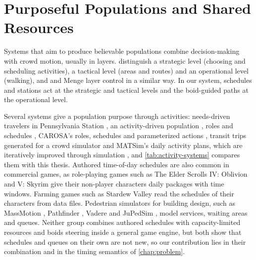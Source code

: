 \section{Purposeful Populations and Shared Resources}\label{sec:soa-purpose}

Systems that aim to produce believable populations combine decision-making with crowd motion, usually in layers. \citet{hoogendoorn2004pedestrian} distinguish a strategic level (choosing and scheduling activities), a tactical level (areas and routes) and an operational level (walking), and \citet{musse2001hierarchical} and Menge \citep{curtis2016menge} layer control in a similar way. In our system, schedules and stations act at the strategic and tactical levels and the boid-guided paths at the operational level.

Several systems give a population purpose through activities: needs-driven travelers in Pennsylvania Station \citep{shao2007autonomous}, an activity-driven population \citep{paris2009activity}, roles and schedules \citep{pelechano2008virtual}, CAROSA's roles, schedules and parameterized actions \citep{allbeck2010carosa}, transit trips generated for a crowd simulator \citep{ricks2020generation} and MATSim's daily activity plans, which are iteratively improved through simulation \citep{horni2016matsim}, and \cref{tab:activity-systems} compares them with this thesis. Authored time-of-day schedules are also common in commercial games, as role-playing games such as The Elder Scrolls IV: Oblivion \citep{bethesda2006oblivion} and V: Skyrim \citep{bethesda2011skyrim} give their non-player characters daily packages with time windows. Farming games such as Stardew Valley \citep{concernedape2016stardew} read the schedules of their characters from data files. Pedestrian simulators for building design, such as MassMotion \citep{oasys2026massmotion}, Pathfinder \citep{thunderhead2026pathfinder}, Vadere \citep{kleinmeier2019vadere} and JuPedSim \citep{jupedsim2026}, model services, waiting areas and queues. Neither group combines authored schedules with capacity-limited resources and boids steering inside a general game engine, but both show that schedules and queues on their own are not new, so our contribution lies in their combination and in the timing semantics of \cref{chap:problem}.

